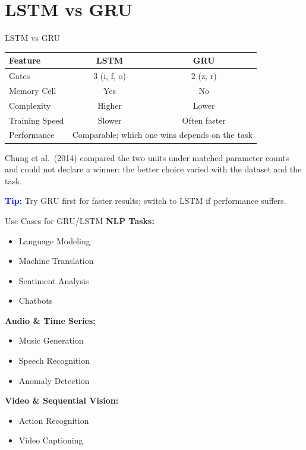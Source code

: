 \section{LSTM vs GRU}
\begin{frame}{LSTM vs GRU}
  \small
  \begin{table}[h]
    \centering
    \begin{tabular}{|l|c|c|}
      \hline
      \textbf{Feature} & \textbf{LSTM} & \textbf{GRU} \\
      \hline
      Gates & 3 (i, f, o) & 2 (z, r) \\
      Memory Cell & Yes & No \\
      Complexity & Higher & Lower \\
      Training Speed & Slower & Often faster \\
      Performance & \multicolumn{2}{c|}{Comparable; which one wins depends on the task} \\
      \hline
    \end{tabular}
  \end{table}
  \vspace{0.5em}
  Chung et al.\ (2014) compared the two units under matched parameter counts and could not
  declare a winner: the better choice varied with the dataset and the task.
  \vspace{0.5em}

  \textbf{\textcolor{blue}{Tip:}} Try GRU first for faster results; switch to LSTM if performance suffers.
\end{frame}

\begin{frame}{Use Cases for GRU/LSTM}
  \small
  \textbf{NLP Tasks:}
  \begin{itemize}
    \item Language Modeling
    \item Machine Translation
    \item Sentiment Analysis
    \item Chatbots
  \end{itemize}
  \textbf{Audio \& Time Series:}
  \begin{itemize}
    \item Music Generation
    \item Speech Recognition
    \item Anomaly Detection
  \end{itemize}
  \textbf{Video \& Sequential Vision:}
  \begin{itemize}
    \item Action Recognition
    \item Video Captioning
  \end{itemize}
\end{frame}

